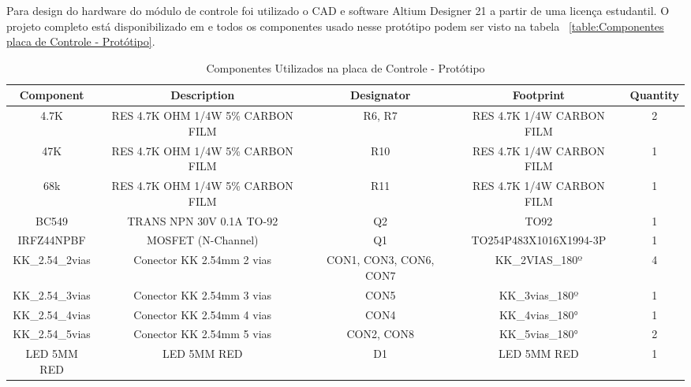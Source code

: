 \documentclass[../delivery_hospital_report.tex]{subfiles}
\begin{document}
Para design do hardware do módulo de controle foi utilizado o CAD e software Altium Designer 21 \cite{altium21} a partir de uma licença estudantil. O projeto completo está disponibilizado em \cite{github_modulos} e todos os componentes usado nesse protótipo podem ser visto na tabela ~\ref{table:Componentes placa de Controle - Protótipo}.

\begin{table}[!h]
\caption{Componentes Utilizados na placa de Controle - Protótipo}
\centering
\begin{adjustbox}{width=\columnwidth,center}
\begin{tabular}{|c|c|c|c|c|}
\hline
Component                   & Description                                  & Designator             & Footprint                 & Quantity \\ \hline
4.7K                      & RES 4.7K OHM 1/4W 5\% CARBON FILM            & R6, R7                 & RES 4.7K 1/4W CARBON FILM & 2        \\ \hline
47K                       & RES 4.7K OHM 1/4W 5\% CARBON FILM            & R10                    & RES 4.7K 1/4W CARBON FILM & 1        \\ \hline
68k                       & RES 4.7K OHM 1/4W 5\% CARBON FILM            & R11                    & RES 4.7K 1/4W CARBON FILM & 1        \\ \hline
BC549                     & TRANS NPN 30V 0.1A TO-92                     & Q2                     & TO92                      & 1        \\ \hline
IRFZ44NPBF                & MOSFET (N-Channel)                           & Q1                     & TO254P483X1016X1994-3P    & 1        \\ \hline
KK\_2.54\_2vias           & Conector KK 2.54mm 2 vias                    & CON1, CON3, CON6, CON7 & KK\_2VIAS\_180º           & 4        \\ \hline
KK\_2.54\_3vias           & Conector KK 2.54mm 3 vias                    & CON5                   & KK\_3vias\_180º           & 1        \\ \hline
KK\_2.54\_4vias           & Conector KK 2.54mm 4 vias                    & CON4                   & KK\_4vias\_180°           & 1        \\ \hline
KK\_2.54\_5vias           & Conector KK 2.54mm 5 vias                    & CON2, CON8             & KK\_5vias\_180°           & 2        \\ \hline
LED 5MM RED               & LED 5MM RED                                  & D1                     & LED 5MM RED               & 1        \\ \hline

\end{tabular}
\end{adjustbox}
\end{table}
\end{document}
